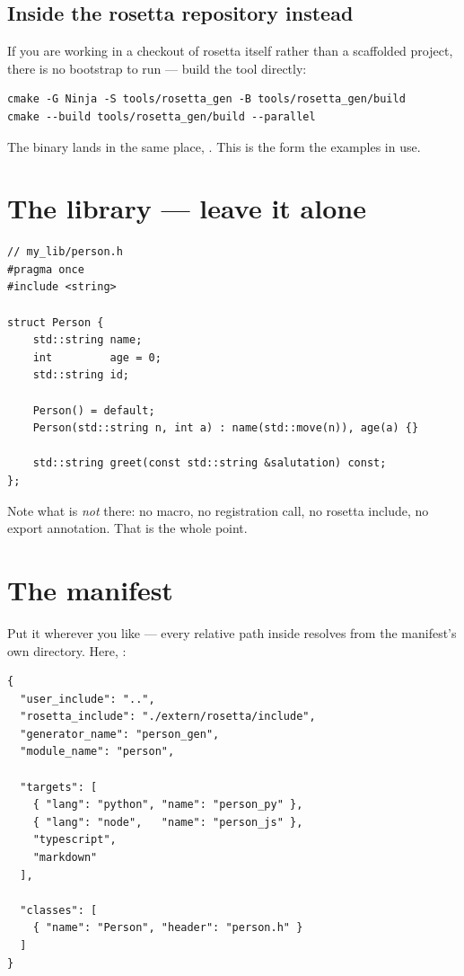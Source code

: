 \subsection*{Inside the rosetta repository instead}

If you are working in a checkout of rosetta itself rather than a scaffolded
project, there is no bootstrap to run --- build the tool directly:

\begin{lstlisting}[style=sh]
cmake -G Ninja -S tools/rosetta_gen -B tools/rosetta_gen/build
cmake --build tools/rosetta_gen/build --parallel
\end{lstlisting}

The binary lands in the same place, . This is the
form the examples in  use.

\section{The library --- leave it alone}

\begin{lstlisting}[style=cpp]
// my_lib/person.h
#pragma once
#include <string>

struct Person {
    std::string name;
    int         age = 0;
    std::string id;

    Person() = default;
    Person(std::string n, int a) : name(std::move(n)), age(a) {}

    std::string greet(const std::string &salutation) const;
};
\end{lstlisting}

Note what is \emph{not} there: no macro, no registration call, no rosetta
include, no export annotation. That is the whole point.

\section{The manifest}

Put it wherever you like --- every relative path inside resolves from the
manifest's own directory. Here, :

\begin{lstlisting}[style=json]
{
  "user_include": "..",
  "rosetta_include": "./extern/rosetta/include",
  "generator_name": "person_gen",
  "module_name": "person",

  "targets": [
    { "lang": "python", "name": "person_py" },
    { "lang": "node",   "name": "person_js" },
    "typescript",
    "markdown"
  ],

  "classes": [
    { "name": "Person", "header": "person.h" }
  ]
}
\end{lstlisting}

